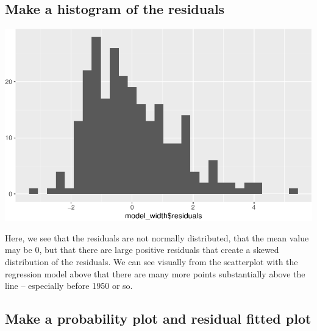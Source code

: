 \documentclass[]{article}
\begin{document}
\hypertarget{make-a-histogram-of-the-residuals}{%
\subsection{Make a histogram of the
residuals}\label{make-a-histogram-of-the-residuals}}

\includegraphics{02_Activity_AfterClass_files/figure-latex/unnamed-chunk-2-1.pdf}

Here, we see that the residuals are not normally distributed, that the
mean value may be 0, but that there are large positive residuals that
create a skewed distribution of the residuals. We can see visually from
the scatterplot with the regression model above that there are many more
points substantially above the line -- especially before 1950 or so.

\hypertarget{make-a-probability-plot-and-residual-fitted-plot}{%
\subsection{Make a probability plot and residual fitted
plot}\label{make-a-probability-plot-and-residual-fitted-plot}}
\end{document}
